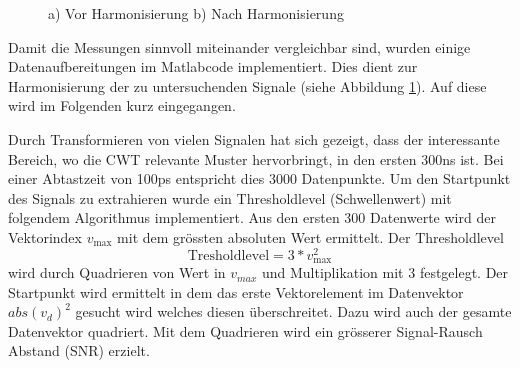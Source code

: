 \begin{refsection}
\begin{figure}
	\begin{subfigure}
		\centering
	\end{subfigure}
	\begin{subfigure}
		\centering
	\end{subfigure}	
\caption{a) Vor Harmonisierung b) Nach Harmonisierung}
\label{fig:Zeitsig}
\end{figure}

Damit die Messungen sinnvoll miteinander vergleichbar sind, wurden einige Datenaufbereitungen im Matlabcode implementiert.
Dies dient zur Harmonisierung der zu untersuchenden Signale (siehe Abbildung \ref{fig:Zeitsig}). 
Auf diese wird im Folgenden kurz eingegangen.

Durch Transformieren von vielen Signalen hat sich gezeigt, dass der interessante Bereich, wo die CWT relevante Muster hervorbringt, in den ersten 300ns ist.
Bei einer Abtastzeit von 100ps entspricht dies 3000 Datenpunkte.
Um den Startpunkt des Signals zu extrahieren wurde ein Thresholdlevel (Schwellenwert) mit folgendem Algorithmus implementiert.
Aus den ersten 300 Datenwerte wird der Vektorindex $v_\text{max}$ mit dem grössten absoluten Wert ermittelt.
Der Thresholdlevel
\begin{equation}
\text{Tresholdlevel} = 3*v_\text{max}^2
\end{equation}
wird durch Quadrieren von Wert in $v_{max}$ und Multiplikation mit 3 festgelegt.
Der Startpunkt wird ermittelt in dem das erste Vektorelement im Datenvektor $abs(v_d)^2$ gesucht wird welches diesen überschreitet.
Dazu wird auch der gesamte Datenvektor quadriert.
Mit dem Quadrieren wird ein grösserer Signal-Rausch Abstand (SNR) erzielt.


\end{refsection}
